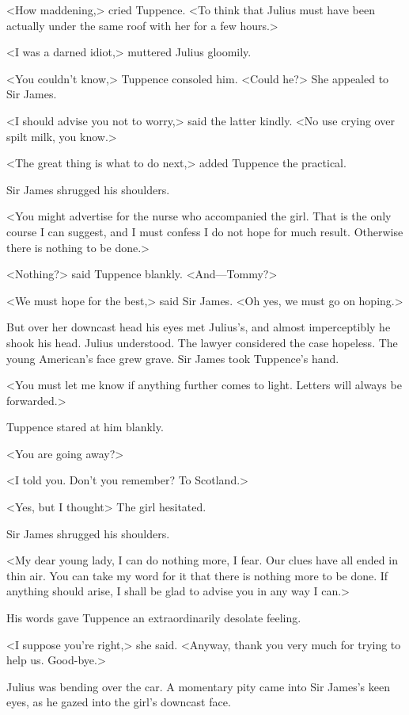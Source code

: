 <How maddening,> cried Tuppence. <To think that Julius must have been actually under the same roof with her for a few hours.>

<I was a darned idiot,> muttered Julius gloomily.

<You couldn't know,> Tuppence consoled him. <Could he?> She appealed to Sir James.

<I should advise you not to worry,> said the latter kindly. <No use crying over spilt milk, you know.>

<The great thing is what to do next,> added Tuppence the practical.

Sir James shrugged his shoulders.

<You might advertise for the nurse who accompanied the girl. That is the only course I can suggest, and I must confess I do not hope for much result. Otherwise there is nothing to be done.>

<Nothing?> said Tuppence blankly. <And—Tommy?>

<We must hope for the best,> said Sir James. <Oh yes, we must go on hoping.>

But over her downcast head his eyes met Julius's, and almost imperceptibly he shook his head. Julius understood. The lawyer considered the case hopeless. The young American's face grew grave. Sir James took Tuppence's hand.

<You must let me know if anything further comes to light. Letters will always be forwarded.>

Tuppence stared at him blankly.

<You are going away?>

<I told you. Don't you remember? To Scotland.>

<Yes, but I thought\longdash> The girl hesitated.

Sir James shrugged his shoulders.

<My dear young lady, I can do nothing more, I fear. Our clues have all ended in thin air. You can take my word for it that there is nothing more to be done. If anything should arise, I shall be glad to advise you in any way I can.>

His words gave Tuppence an extraordinarily desolate feeling.

<I suppose you're right,> she said. <Anyway, thank you very much for trying to help us. Good-bye.>

Julius was bending over the car. A momentary pity came into Sir James's keen eyes, as he gazed into the girl's downcast face.

